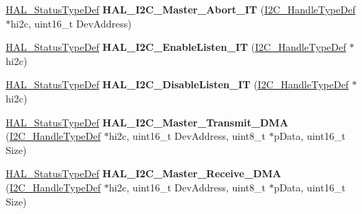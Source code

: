 \begin{DoxyCompactItemize}
\mbox{\hyperlink{stm32f4xx__hal__def_8h_a63c0679d1cb8b8c684fbb0632743478f}{H\+A\+L\+\_\+\+Status\+Type\+Def}} {\bfseries H\+A\+L\+\_\+\+I2\+C\+\_\+\+Master\+\_\+\+Abort\+\_\+\+IT} (\mbox{\hyperlink{struct_i2_c___handle_type_def}{I2\+C\+\_\+\+Handle\+Type\+Def}} $\ast$hi2c, uint16\+\_\+t Dev\+Address)
\item 
\mbox{\label{group___i2_c___exported___functions___group2_gad8c3b67e4430bc8def0c885af769f3ab}} 
\mbox{\hyperlink{stm32f4xx__hal__def_8h_a63c0679d1cb8b8c684fbb0632743478f}{H\+A\+L\+\_\+\+Status\+Type\+Def}} {\bfseries H\+A\+L\+\_\+\+I2\+C\+\_\+\+Enable\+Listen\+\_\+\+IT} (\mbox{\hyperlink{struct_i2_c___handle_type_def}{I2\+C\+\_\+\+Handle\+Type\+Def}} $\ast$hi2c)
\item 
\mbox{\label{group___i2_c___exported___functions___group2_gafd49a2b08bc6e30989c420a9c679b65e}} 
\mbox{\hyperlink{stm32f4xx__hal__def_8h_a63c0679d1cb8b8c684fbb0632743478f}{H\+A\+L\+\_\+\+Status\+Type\+Def}} {\bfseries H\+A\+L\+\_\+\+I2\+C\+\_\+\+Disable\+Listen\+\_\+\+IT} (\mbox{\hyperlink{struct_i2_c___handle_type_def}{I2\+C\+\_\+\+Handle\+Type\+Def}} $\ast$hi2c)
\item 
\mbox{\label{group___i2_c___exported___functions___group2_ga978126d41a3a67384f4cb2fe3e6e7e8f}} 
\mbox{\hyperlink{stm32f4xx__hal__def_8h_a63c0679d1cb8b8c684fbb0632743478f}{H\+A\+L\+\_\+\+Status\+Type\+Def}} {\bfseries H\+A\+L\+\_\+\+I2\+C\+\_\+\+Master\+\_\+\+Transmit\+\_\+\+D\+MA} (\mbox{\hyperlink{struct_i2_c___handle_type_def}{I2\+C\+\_\+\+Handle\+Type\+Def}} $\ast$hi2c, uint16\+\_\+t Dev\+Address, uint8\+\_\+t $\ast$p\+Data, uint16\+\_\+t Size)
\item 
\mbox{\label{group___i2_c___exported___functions___group2_ga299f5e16a92826b9856c60265bc22cf2}} 
\mbox{\hyperlink{stm32f4xx__hal__def_8h_a63c0679d1cb8b8c684fbb0632743478f}{H\+A\+L\+\_\+\+Status\+Type\+Def}} {\bfseries H\+A\+L\+\_\+\+I2\+C\+\_\+\+Master\+\_\+\+Receive\+\_\+\+D\+MA} (\mbox{\hyperlink{struct_i2_c___handle_type_def}{I2\+C\+\_\+\+Handle\+Type\+Def}} $\ast$hi2c, uint16\+\_\+t Dev\+Address, uint8\+\_\+t $\ast$p\+Data, uint16\+\_\+t Size)
\item 
\mbox{\label{group___i2_c___exported___functions___group2_ga59e69e0da57150f980deea0d235f0397}} 

\end{DoxyCompactItemize}
